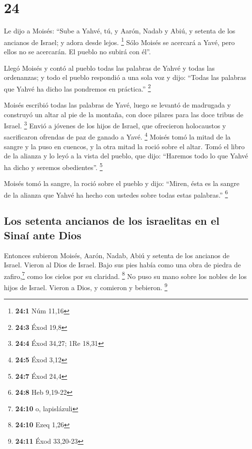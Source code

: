 \hypertarget{section-23}{%
\section{24}\label{section-23}}

 Le dijo a Moisés: ``Sube a Yahvé, tú, y Aarón, Nadab y
Abiú, y setenta de los ancianos de Israel; y adora desde lejos.
\footnote{\textbf{24:1} Núm 11,16}  Sólo Moisés se
acercará a Yavé, pero ellos no se acercarán. El pueblo no subirá con
él''.

 Llegó Moisés y contó al pueblo todas las palabras de
Yahvé y todas las ordenanzas; y todo el pueblo respondió a una sola voz
y dijo: ``Todas las palabras que Yahvé ha dicho las pondremos en
práctica.'' \footnote{\textbf{24:3} Éxod 19,8}

 Moisés escribió todas las palabras de Yavé, luego se
levantó de madrugada y construyó un altar al pie de la montaña, con doce
pilares para las doce tribus de Israel. \footnote{\textbf{24:4} Éxod
  34,27; 1Re 18,31}  Envió a jóvenes de los hijos de
Israel, que ofrecieron holocaustos y sacrificaron ofrendas de paz de
ganado a Yavé. \footnote{\textbf{24:5} Éxod 3,12}  Moisés
tomó la mitad de la sangre y la puso en cuencos, y la otra mitad la
roció sobre el altar.  Tomó el libro de la alianza y lo
leyó a la vista del pueblo, que dijo: ``Haremos todo lo que Yahvé ha
dicho y seremos obedientes''. \footnote{\textbf{24:7} Éxod 24,4}

 Moisés tomó la sangre, la roció sobre el pueblo y dijo:
``Miren, ésta es la sangre de la alianza que Yahvé ha hecho con ustedes
sobre todas estas palabras.'' \footnote{\textbf{24:8} Heb 9,19-22}

\hypertarget{los-setenta-ancianos-de-los-israelitas-en-el-sinauxed-ante-dios}{%
\subsection{Los setenta ancianos de los israelitas en el Sinaí ante
Dios}\label{los-setenta-ancianos-de-los-israelitas-en-el-sinauxed-ante-dios}}

 Entonces subieron Moisés, Aarón, Nadab, Abiú y setenta de
los ancianos de Israel.  Vieron al Dios de Israel. Bajo
sus pies había como una obra de piedra de zafiro,\footnote{\textbf{24:10}
  o, lapislázuli} como los cielos por su claridad. \footnote{\textbf{24:10}
  Ezeq 1,26}  No puso su mano sobre los nobles de los
hijos de Israel. Vieron a Dios, y comieron y bebieron. \footnote{\textbf{24:11}
  Éxod 33,20-23}

